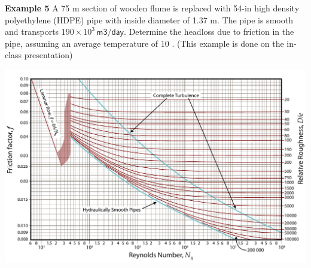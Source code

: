 \documentclass[10pt, onesided]{amsart}
\begin{document}
	
	\newpage
	
	
	\textbf{Example 5}
	A 75 m section of wooden flume is replaced with 54-in high
	density polyethylene (HDPE) pipe with inside diameter of
	1.37 m. The pipe is smooth and transports $ 190 \times 10^3\mathsf{\, m3/day}$.
	Determine the headloss due to friction in the pipe, assuming
	an average temperature of 10 \textcelsius.
	\parb
	(This example is done on the in-class presentation)
	
	\begin{center}
		\includegraphics[scale=1.05, angle=90]{../../figs/05FrictionLosses/moody.pdf}
	\end{center}
	
	
	\newpage
	
\end{document}
